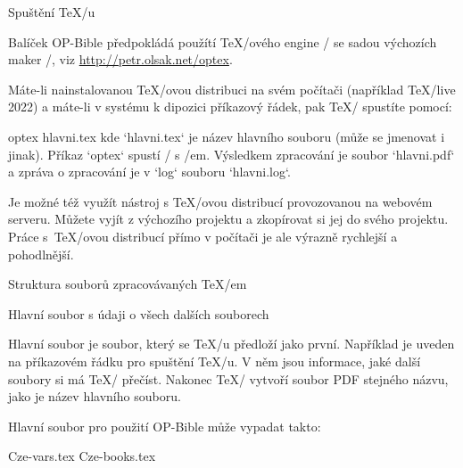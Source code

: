 \sec Spuštění \TeX/u

Balíček OP-Bible předpokládá použítí \TeX/ového engine \LuaTeX/ se
sadou výchozích maker \OpTeX/, viz \url{http://petr.olsak.net/optex}. 

Máte-li nainstalovanou \TeX/ovou distribuci na svém počítači (například \TeX/live
2022) a máte-li v systému k dipozici příkazový řádek, pak \TeX/ spustíte pomocí:

\begtt
optex hlavni.tex
\endtt
kde `hlavni.tex` je název hlavního souboru (může se jmenovat i jinak). 
Příkaz `optex` spustí \LuaTeX/ s \OpTeX/em. Výsledkem zpracování je soubor 
`hlavni.pdf` a zpráva o zpracování je v `log` souboru `hlavni.log`.

Je možné též využít nástroj  s
\TeX/ovou distribucí provozovanou na webovém serveru. Můžete vyjít z výchozího
projektu  a zkopírovat si jej do svého
projektu. Práce s~\TeX/ovou distribucí přímo v počítači je ale výrazně
rychlejší a pohodlnější. 


\sec Struktura souborů zpracovávaných \TeX/em

\secc[hlavni] Hlavní soubor s údaji o všech dalších souborech

Hlavní soubor je soubor, který se \TeX/u předloží jako první. Například je
uveden na příkazovém řádku pro spuštění \TeX/u. V něm jsou informace, jaké
další soubory si má \TeX/ přečíst. Nakonec \TeX/ vytvoří soubor PDF stejného
názvu, jako je název hlavního souboru.

Hlavní soubor pro použití OP-Bible může vypadat takto:

\begtt
\load[op-bible]  %
\cslang

\def\tmark     {BKR}    %
 {Cze-vars.tex}   %
 {Cze-books.tex}  %

\def\txsfile     {sources/Cze\tmark-\amark.txs}     %
\def\fmtfile     {formats/fmt-Cze\tmark-\amark.tex} %
\def\notesfile   {notes/notes-\amark.tex}           %
\def\introfile   {others/intro-\amark.tex}          %
\def\articlefile {others/articles-\amark.tex}       %

\def\printedbooks {%
   Gn Ex Lv Nu Dt Joz Sd Rt 1S 2S 1Kr 2Kr 1CPa 2Pa Ezd Neh
   Est Jb Ž Př Kaz Pís Iz Jr Pl Ez Da Oz Jl Am Abd Jon Mi
   Na Abk Sf Ag Za Mal 
   Mt Mk L J Sk Ř 1K 2K Ga Ef Fp Ko 1Te 2Te 1Tm 2Tm 
   Tt Fm Žd Jk 1Pt 2Pt 1J 2J 3J Ju Zj
}
\processbooks %
\bye
\endtt

